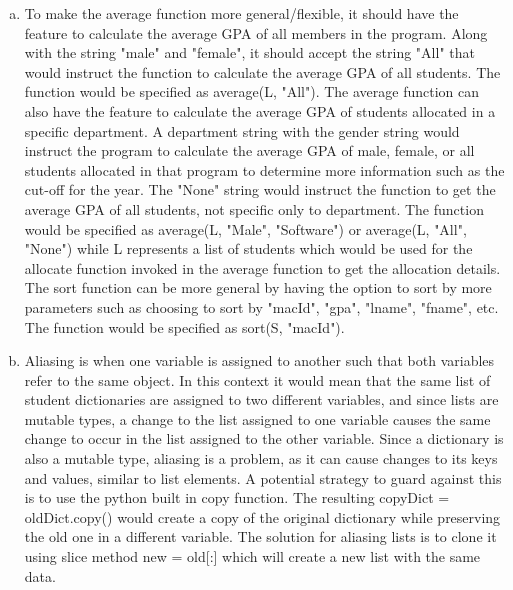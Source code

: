 \documentclass[12pt]{article}
\begin{document}
\begin{enumerate}[(a)]

\item To make the average function more general/flexible, it should have the feature to calculate the average GPA of all members in the program. 
Along with the string "male" and "female", it should accept the string "All" that would instruct the function to calculate the average GPA of all 
students. The function would be specified as average(L, "All"). The average function can also have the feature to calculate the average GPA of 
students allocated in a specific department. A department string with the gender string would instruct the program to calculate 
the average GPA of male, female, or all students allocated in that program to determine more information such as the cut-off for the year. The "None" 
string would instruct the function to get the average GPA of all students, not specific only to department. The function would be specified as 
average(L, "Male", "Software") or average(L, "All", "None") while L represents a list of students which would be used for the allocate function 
invoked in the average function to get the allocation details. The sort function can be more general by having the option to sort by more
parameters such as choosing to sort by "macId", "gpa", "lname", "fname", etc. The function would be specified as sort(S, "macId").  

\item Aliasing is when one variable is assigned to another such that both variables refer to the same object. In this context it would mean that
the same list of student dictionaries are assigned to two different variables, and since lists are mutable types, a change to the list assigned to 
one variable causes the same change to occur in the list assigned to the other variable. Since a dictionary is also a mutable type, aliasing is a problem, 
as it can cause changes to its keys and values, similar to list elements. A potential strategy to guard against this is to use the python built in 
copy function. The resulting copyDict = oldDict.copy() would create a copy of the original dictionary while preserving the old one in a different 
variable. The solution for aliasing lists is to clone it using slice method new = old[:] which will create a new list with the same data.


\end{enumerate}
\end{document}
